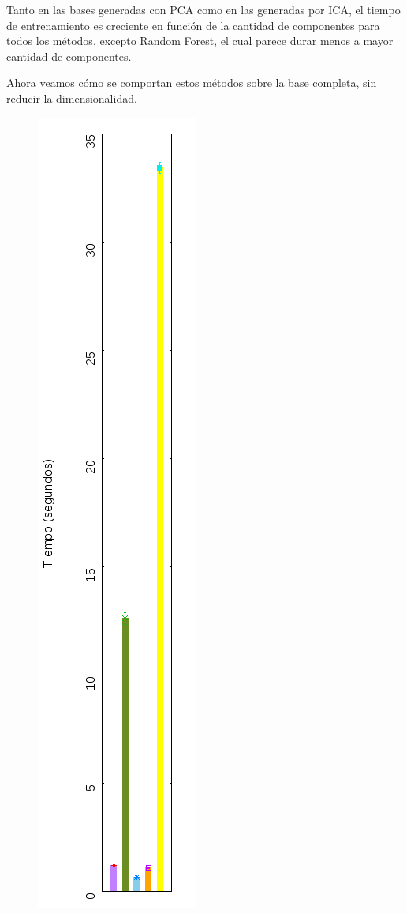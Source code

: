 \documentclass[10pt, a4paper]{article}
\begin{document}
Tanto en las bases generadas con PCA como en las generadas por ICA, el tiempo de entrenamiento es creciente en función de la cantidad de componentes para todos los métodos, excepto Random Forest, el cual parece durar menos a mayor cantidad de componentes.

Ahora veamos cómo se comportan estos métodos sobre la base completa, sin reducir la dimensionalidad.

\begin{figure}[H]
\centering
\includegraphics[scale=0.6,angle=-90]{../src/data/tm.png}
\end{figure}
\end{document}
